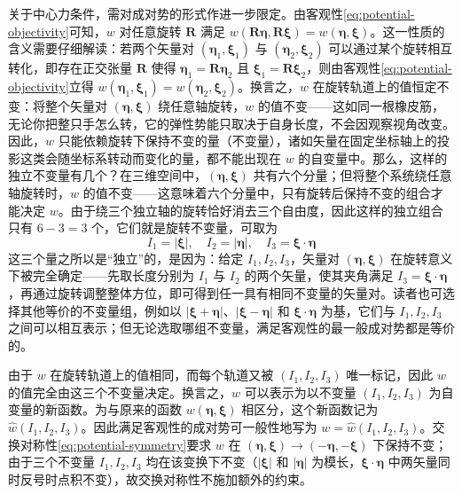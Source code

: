 关于中心力条件，需对成对势的形式作进一步限定。由客观性\eqref{eq:potential-objectivity}可知，$w$ 对任意旋转 $\mathbf{R}$ 满足 $w(\mathbf{R}\boldsymbol{\eta},\mathbf{R}\boldsymbol{\xi})=w(\boldsymbol{\eta},\boldsymbol{\xi})$。这一性质的含义需要仔细解读：若两个矢量对 $(\boldsymbol{\eta}_1,\boldsymbol{\xi}_1)$ 与 $(\boldsymbol{\eta}_2,\boldsymbol{\xi}_2)$ 可以通过某个旋转相互转化，即存在正交张量 $\mathbf{R}$ 使得 $\boldsymbol{\eta}_1=\mathbf{R}\boldsymbol{\eta}_2$ 且 $\boldsymbol{\xi}_1=\mathbf{R}\boldsymbol{\xi}_2$，则由客观性\eqref{eq:potential-objectivity}立得 $w(\boldsymbol{\eta}_1,\boldsymbol{\xi}_1)=w(\boldsymbol{\eta}_2,\boldsymbol{\xi}_2)$。换言之，$w$ 在旋转轨道上的值恒定不变：将整个矢量对 $(\boldsymbol{\eta},\boldsymbol{\xi})$ 绕任意轴旋转，$w$ 的值不变——这如同一根橡皮筋，无论你把整只手怎么转，它的弹性势能只取决于自身长度，不会因观察视角改变。因此，$w$ 只能依赖旋转下保持不变的量（不变量），诸如矢量在固定坐标轴上的投影这类会随坐标系转动而变化的量，都不能出现在 $w$ 的自变量中。那么，这样的独立不变量有几个？在三维空间中，$(\boldsymbol{\eta},\boldsymbol{\xi})$ 共有六个分量；但将整个系统绕任意轴旋转时，$w$ 的值不变——这意味着六个分量中，只有旋转后保持不变的组合才能决定 $w$。由于绕三个独立轴的旋转恰好消去三个自由度，因此这样的独立组合只有 $6-3=3$ 个，它们就是旋转不变量，可取为
\begin{equation}
  I_1=|\boldsymbol{\xi}|,\quad I_2=|\boldsymbol{\eta}|,\quad I_3=\boldsymbol{\xi}\cdot\boldsymbol{\eta}
  \label{eq:rotation-invariants}
\end{equation}
这三个量之所以是``独立''的，是因为：给定 $I_1,I_2,I_3$，矢量对 $(\boldsymbol{\eta},\boldsymbol{\xi})$ 在旋转意义下被完全确定——先取长度分别为 $I_1$ 与 $I_2$ 的两个矢量，使其夹角满足 $I_3=\boldsymbol{\xi}\cdot\boldsymbol{\eta}$，再通过旋转调整整体方位，即可得到任一具有相同不变量的矢量对。读者也可选择其他等价的不变量组，例如以 $|\boldsymbol{\xi}+\boldsymbol{\eta}|$、$|\boldsymbol{\xi}-\boldsymbol{\eta}|$ 和 $\boldsymbol{\xi}\cdot\boldsymbol{\eta}$ 为基，它们与 $I_1,I_2,I_3$ 之间可以相互表示；但无论选取哪组不变量，满足客观性的最一般成对势都是等价的。

由于 $w$ 在旋转轨道上的值相同，而每个轨道又被 $(I_1,I_2,I_3)$ 唯一标记，因此 $w$ 的值完全由这三个不变量决定。换言之，$w$ 可以表示为以不变量 $(I_1,I_2,I_3)$ 为自变量的新函数。为与原来的函数 $w(\boldsymbol{\eta},\boldsymbol{\xi})$ 相区分，这个新函数记为 $\hat{w}(I_1,I_2,I_3)$。因此满足客观性的成对势可一般性地写为 $w=\hat{w}(I_1,I_2,I_3)$。交换对称性\eqref{eq:potential-symmetry}要求 $w$ 在 $(\boldsymbol{\eta},\boldsymbol{\xi})\to(-\boldsymbol{\eta},-\boldsymbol{\xi})$ 下保持不变；由于三个不变量 $I_1, I_2, I_3$ 均在该变换下不变（$|\boldsymbol{\xi}|$ 和 $|\boldsymbol{\eta}|$ 为模长，$\boldsymbol{\xi}\cdot\boldsymbol{\eta}$ 中两矢量同时反号时点积不变），故交换对称性不施加额外的约束。

